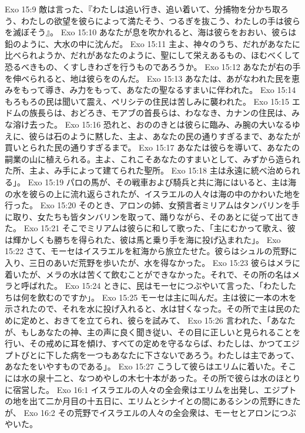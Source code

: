 Exo 15:9  敵は言った、『わたしは追い行き、追い着いて、分捕物を分かち取ろう、わたしの欲望を彼らによって満たそう、つるぎを抜こう、わたしの手は彼らを滅ぼそう』。
Exo 15:10  あなたが息を吹かれると、海は彼らをおおい、彼らは鉛のように、大水の中に沈んだ。
Exo 15:11  主よ、神々のうち、だれがあなたに比べられようか、だれがあなたのように、聖にして栄えあるもの、ほむべくして恐るべきもの、くすしきわざを行うものであろうか。
Exo 15:12  あなたが右の手を伸べられると、地は彼らをのんだ。
Exo 15:13  あなたは、あがなわれた民を恵みをもって導き、み力をもって、あなたの聖なるすまいに伴われた。
Exo 15:14  もろもろの民は聞いて震え、ペリシテの住民は苦しみに襲われた。
Exo 15:15  エドムの族長らは、おどろき、モアブの首長らは、わななき、カナンの住民は、みな溶け去った。
Exo 15:16  恐れと、おののきとは彼らに臨み、み腕の大いなるゆえに、彼らは石のように黙した、主よ、あなたの民の通りすぎるまで、あなたが買いとられた民の通りすぎるまで。
Exo 15:17  あなたは彼らを導いて、あなたの嗣業の山に植えられる。主よ、これこそあなたのすまいとして、みずから造られた所、主よ、み手によって建てられた聖所。
Exo 15:18  主は永遠に統べ治められる」。
Exo 15:19  パロの馬が、その戦車および騎兵と共に海にはいると、主は海の水を彼らの上に流れ返らされたが、イスラエルの人々は海の中のかわいた地を行った。
Exo 15:20  そのとき、アロンの姉、女預言者ミリアムはタンバリンを手に取り、女たちも皆タンバリンを取って、踊りながら、そのあとに従って出てきた。
Exo 15:21  そこでミリアムは彼らに和して歌った、「主にむかって歌え、彼は輝かしくも勝ちを得られた、彼は馬と乗り手を海に投げ込まれた」。
Exo 15:22  さて、モーセはイスラエルを紅海から旅立たせた。彼らはシュルの荒野に入り、三日のあいだ荒野を歩いたが、水を得なかった。
Exo 15:23  彼らはメラに着いたが、メラの水は苦くて飲むことができなかった。それで、その所の名はメラと呼ばれた。
Exo 15:24  ときに、民はモーセにつぶやいて言った、「わたしたちは何を飲むのですか」。
Exo 15:25  モーセは主に叫んだ。主は彼に一本の木を示されたので、それを水に投げ入れると、水は甘くなった。その所で主は民のために定めと、おきてを立てられ、彼らを試みて、
Exo 15:26  言われた、「あなたが、もしあなたの神、主の声に良く聞き従い、その目に正しいと見られることを行い、その戒めに耳を傾け、すべての定めを守るならば、わたしは、かつてエジプトびとに下した病を一つもあなたに下さないであろう。わたしは主であって、あなたをいやすものである」。
Exo 15:27  こうして彼らはエリムに着いた。そこには水の泉十二と、なつめやしの木七十本があった。その所で彼らは水のほとりに宿営した。
Exo 16:1  イスラエルの人々の全会衆はエリムを出発し、エジプトの地を出て二か月目の十五日に、エリムとシナイとの間にあるシンの荒野にきたが、
Exo 16:2  その荒野でイスラエルの人々の全会衆は、モーセとアロンにつぶやいた。
